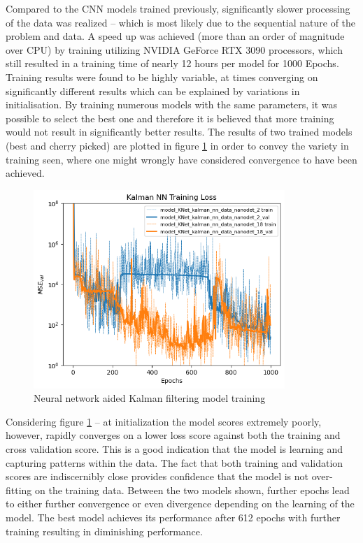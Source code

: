 \documentclass[a4paper,twoside,12pt]{report}
\begin{document}
Compared to the CNN models trained previously, significantly slower processing of the data was realized -- which is most likely due to the sequential nature of the problem and data. A speed up was achieved (more than an order of magnitude over CPU) by training utilizing NVIDIA GeForce RTX 3090 processors, which still resulted in a training time of nearly 12 hours per model for 1000 Epochs. Training results were found to be highly variable, at times converging on significantly different results which can be explained by variations in initialisation. By training numerous models with the same parameters, it was possible to select the best one and therefore it is believed that more training would not result in significantly better results. The results of two trained models (best and cherry picked) are plotted in figure \ref{fig:RNNtrain} in order to convey the variety in training seen, where one might wrongly have considered convergence to have been achieved.

\begin{figure}[h!]
\begin{center}
\includegraphics[width=9.5cm]{images/knet_train.png}
\caption{Neural network aided Kalman filtering model training}
\label{fig:RNNtrain}
\end{center}
\end{figure}

Considering figure \ref{fig:RNNtrain} -- at initialization the model scores extremely poorly, however, rapidly converges on a lower loss score against both the training and cross validation score. This is a good indication that the model is learning and capturing patterns within the data. The fact that both training and validation scores are indiscernibly close provides confidence that the model is not over-fitting on the training data. Between the two models shown, further epochs lead to either further convergence or even divergence depending on the learning of the model. The best model achieves its performance after 612 epochs with further training resulting in diminishing performance.
\end{document}
